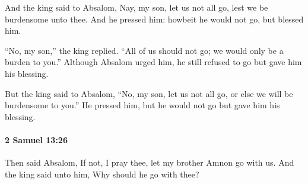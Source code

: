 			\begin{versebox}
					\item[BHS] 
					\item[ASV] And the king said to Absalom, Nay, my son, let us not all go, lest we be burdensome unto thee. And he pressed him: howbeit he would not go, but blessed him.
					\item[NIV] “No, my son,” the king replied. “All of us should not go; we would only be a burden to you.” Although Absalom urged him, he still refused to go but gave him his blessing.
					\item[NRSV] But the king said to Absalom, “No, my son, let us not all go, or else we will be burdensome to you.” He pressed him, but he would not go but gave him his blessing.
			\end{versebox}

		\paragraph{2 Samuel 13:26} %
			\label{2SAMUEL-13-26}

			Then said Absalom, If not, I pray thee, let my brother Amnon go with us. And the king said unto him, Why should he go with thee?

